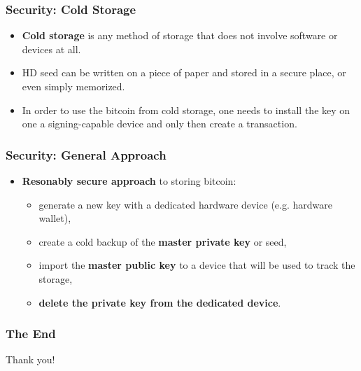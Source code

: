 \documentclass{beamer}
\begin{document}
\begin{frame}
  \frametitle{Security: Cold Storage}
  \begin{itemize}
  \item \textbf{Cold storage} is any method of storage that does not involve
    software or devices at all.
  \item HD seed can be written on a piece of paper and stored in a secure place,
    or even simply memorized.
  \item In order to use the bitcoin from cold storage, one needs to install the
    key on one a signing-capable device and only then create a transaction.
  \end{itemize}
\end{frame}

\begin{frame}
  \frametitle{Security: General Approach}
  \begin{itemize}
  \item \textbf{Resonably secure approach} to storing bitcoin:
    \begin{itemize}
    \item generate a new key with a dedicated hardware device (e.g. hardware
      wallet),
    \item create a cold backup of the \textbf{master private key} or seed,
    \item import the \textbf{master public key} to a device that will be used to
      track the storage,
    \item \textbf{delete the private key from the dedicated device}.
    \end{itemize}
  \end{itemize}
\end{frame}


\begin{frame}
  \frametitle{The End}
  \begin{center}
    Thank you!
  \end{center}
\end{frame}
\end{document}
